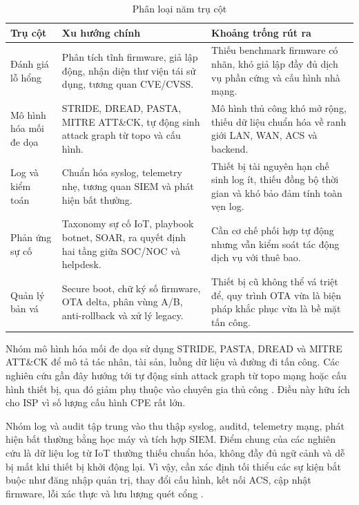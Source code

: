 \documentclass[../DoAn.tex]{subfiles}
\begin{document}
\begin{table}[H]
\centering
\begin{tabular}{|p{2.8cm}|p{4.1cm}|p{4.2cm}|}
\hline
\textbf{Trụ cột}  & \textbf{Xu hướng chính} & \textbf{Khoảng trống rút ra} \\ \hline
Đánh giá lỗ hổng  & Phân tích tĩnh firmware, giả lập động, nhận diện thư viện tái sử dụng, tương quan CVE/CVSS. & Thiếu benchmark firmware có nhãn, khó giả lập đầy đủ dịch vụ phần cứng và cấu hình nhà mạng. \\ \hline
Mô hình hóa mối đe dọa & STRIDE, DREAD, PASTA, MITRE ATT\&CK, tự động sinh attack graph từ topo và cấu hình. & Mô hình thủ công khó mở rộng, thiếu dữ liệu chuẩn hóa về ranh giới LAN, WAN, ACS và backend. \\ \hline
Log và kiểm toán  & Chuẩn hóa syslog, telemetry nhẹ, tương quan SIEM và phát hiện bất thường. & Thiết bị tài nguyên hạn chế sinh log ít, thiếu đồng bộ thời gian và khó bảo đảm tính toàn vẹn log. \\ \hline
Phản ứng sự cố  & Taxonomy sự cố IoT, playbook botnet, SOAR, ra quyết định hai tầng giữa SOC/NOC và helpdesk. & Cần cơ chế phối hợp tự động nhưng vẫn kiểm soát tác động dịch vụ với thuê bao. \\ \hline
Quản lý bản vá & Secure boot, chữ ký số firmware, OTA delta, phân vùng A/B, anti-rollback và xử lý legacy. & Thiết bị cũ không thể vá triệt để, quy trình OTA vừa là biện pháp khắc phục vừa là bề mặt tấn công. \\ \hline
\end{tabular}
\caption{Phân loại năm trụ cột}
\label{tab:literature-classification}
\end{table}

Nhóm mô hình hóa mối đe dọa sử dụng STRIDE, PASTA, DREAD và MITRE ATT\&CK để mô tả tác nhân, tài sản, luồng dữ liệu và đường đi tấn công. Các nghiên cứu gần đây hướng tới tự động sinh attack graph từ topo mạng hoặc cấu hình thiết bị, qua đó giảm phụ thuộc vào chuyên gia thủ công \cite{stridepasta2022,smsi2025,attackiot2023}. Điều này hữu ích cho ISP vì số lượng cấu hình CPE rất lớn.

Nhóm log và audit tập trung vào thu thập syslog, auditd, telemetry mạng, phát hiện bất thường bằng học máy và tích hợp SIEM. Điểm chung của các nghiên cứu là dữ liệu log từ IoT thường thiếu chuẩn hóa, không đầy đủ ngữ cảnh và dễ bị mất khi thiết bị khởi động lại. Vì vậy, cần xác định tối thiểu các sự kiện bắt buộc như đăng nhập quản trị, thay đổi cấu hình, kết nối ACS, cập nhật firmware, lỗi xác thực và lưu lượng quét cổng \cite{siemiot2024,logaudit2023}.
\end{document}
